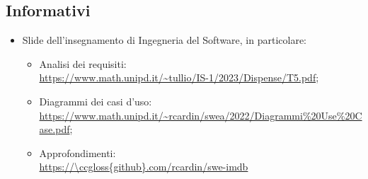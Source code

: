 \subsection{Informativi}
\begin{itemize}
    \item Slide dell’insegnamento di Ingegneria del Software, in particolare:
        \begin{itemize}
            \item Analisi dei requisiti: \\ \url{https://www.math.unipd.it/~tullio/IS-1/2023/Dispense/T5.pdf};
            \item Diagrammi dei casi d'uso:\\ \url{https://www.math.unipd.it/~rcardin/swea/2022/Diagrammi%20Use%20Case.pdf};
            \item Approfondimenti:\\ \url{https://\ccgloss{github}.com/rcardin/swe-imdb}
        \end{itemize}
\end{itemize}
